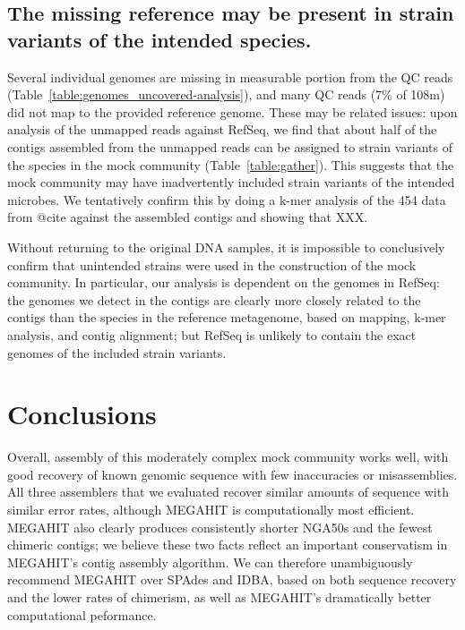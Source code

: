 \documentclass[10pt,a4paper,twocolumn]{article}
\begin{document}

\subsection*{The missing reference may be present in strain variants of the intended species.}

Several individual genomes are missing in measurable portion from the
QC reads (Table~\ref{table:genomes_uncovered-analysis}), and many QC
reads (7\% of 108m) did not map to the provided reference genome.
These may be related issues: upon analysis of the unmapped reads
against RefSeq, we find that about half of the contigs assembled from
the unmapped reads can be assigned to strain variants of the species
in the mock community (Table~\ref{table:gather}).  This suggests that
the mock community may have inadvertently included strain variants of
the intended microbes.  We tentatively confirm this by doing a k-mer
analysis of the 454 data from @cite against the assembled contigs and
showing that XXX.

Without returning to the original DNA samples, it is impossible to
conclusively confirm that unintended strains were used in the
construction of the mock community.  In particular, our analysis is
dependent on the genomes in RefSeq: the genomes we detect in the
contigs are clearly more closely related to the contigs than the
species in the reference metagenome, based on mapping, k-mer analysis,
and contig alignment; but RefSeq is unlikely to contain the exact
genomes of the included strain variants.


\section*{Conclusions}

Overall, assembly of this moderately complex mock community works
well, with good recovery of known genomic sequence with few
inaccuracies or misassemblies.  All three assemblers that we evaluated
recover similar amounts of sequence with similar error rates, although
MEGAHIT is computationally most efficient.  MEGAHIT also clearly
produces consistently shorter NGA50s and the fewest chimeric contigs;
we believe these two facts reflect an important conservatism in
MEGAHIT's contig assembly algorithm.  We can therefore unambiguously
recommend MEGAHIT over SPAdes and IDBA, based on both sequence
recovery and the lower rates of chimerism, as well as MEGAHIT's dramatically
better computational peformance.
\end{document}
